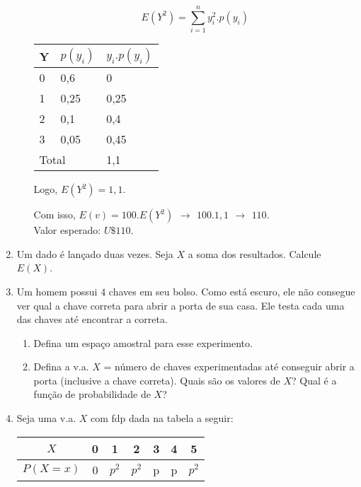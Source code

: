 \begin{enumerate}
\begin{enumerate}[label=\alph*)]
{			\begin{equation*}
				{E(Y^{2}) = \sum^{n}_{i=1} y_{i}^{2}.p(y_{i})}
			\end{equation*}
				\begin{center}
				\begin{tabular}{|l|l|l|}
					\hline
					Y        & $p(y_{i})$       & $y_{i}.p(y_{i})$ \\ \hline
					0        & 0,6              & 0                \\ \hline
					1        & 0,25             & 0,25             \\ \hline
					2        & 0,1              & 0,4              \\ \hline
					3        & 0,05             & 0,45             \\ \hline
					\multicolumn{2}{|l|}{Total} & 1,1             \\ \hline
				\end{tabular}
				\end{center}
				
		Logo, $E(Y^{2}) = 1,1$.
		
		Com isso, $E(v)=100.E(Y^{2})\ \, \to \,\ 100.1,1\ \, \to \,\ 110$.\\Valor esperado: $U\$ 110$.
		}
	\end{enumerate}

\setcounter{enumi}{4}
\item Um dado é lançado duas vezes. Seja $X$ a soma dos resultados. Calcule $E(X)$.
	
\item Um homem possui $4$ chaves em seu bolso. Como está escuro, ele não consegue ver qual a
chave correta para abrir a porta de sua casa. Ele testa cada uma das chaves até encontrar a
correta.

	\begin{enumerate}[label=\alph*)]
		\item Defina um espaço amostral para esse experimento.
		\item Defina a v.a. $X$ = número de chaves experimentadas até conseguir abrir a porta (inclusive a chave correta). 
		Quais são os valores de $X$? Qual é a função de probabilidade de $X$?
	\end{enumerate}
	
\item Seja uma v.a. $X$ com fdp dada na tabela a seguir:

    \begin{table}[htpb]
        \centering
        \begin{tabular}{|c|c|c|c|c|c|c|}
            \hline
            $X$      & 0 & 1       & 2       & 3 & 4 & 5 \\ \hline
            $P(X=x)$ & 0 & $p^{2}$ & $p^{2}$ & p & p & $p^{2}$ \\ \hline
        \end{tabular}
    \end{table}
    

\end{enumerate}

